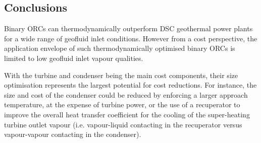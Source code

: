 


\subsection{Conclusions}
    Binary \ac{ORC}s can thermodynamically outperform \ac{DSC} geothermal power plants for a wide range of geofluid inlet conditions. However from a cost perspective, the application envelope of such thermodynamically optimised binary \ac{ORC}s is limited to low geofluid inlet vapour qualities.

    With the turbine and condenser being the main cost components, their size optimisation represents the largest potential for cost reductions. For instance, the size and cost of the condenser could be reduced by enforcing a larger approach temperature, at the expense of turbine power, or the use of a recuperator to improve the overall heat transfer coefficient for the cooling of the super-heating turbine outlet vapour (i.e. vapour-liquid contacting in the recuperator versus vapour-vapour contacting in the condenser).

\clearpage